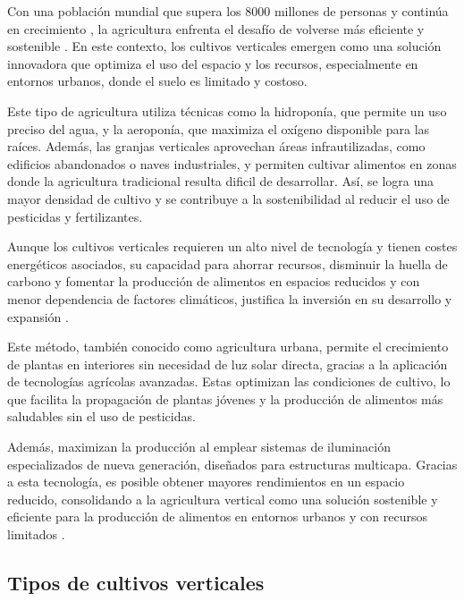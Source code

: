 Con una población mundial que supera los 8000 millones de personas y continúa en crecimiento \cite{PEOPLE}, la agricultura enfrenta el desafío de volverse más eficiente y sostenible \cite{AGUA} \cite{FAO} \cite{SANTANDER}. En este contexto, los cultivos verticales emergen como una solución innovadora que optimiza el uso del espacio y los recursos, especialmente en entornos urbanos, donde el suelo es limitado y costoso.

Este tipo de agricultura utiliza técnicas como la hidroponía, que permite un uso preciso del agua, y la aeroponía, que maximiza el oxígeno disponible para las raíces. Además, las granjas verticales aprovechan áreas infrautilizadas, como edificios abandonados o naves industriales, y permiten cultivar alimentos en zonas donde la agricultura tradicional resulta dificil de desarrollar. Así, se logra una mayor densidad de cultivo y se contribuye a la sostenibilidad al reducir el uso de pesticidas y fertilizantes.

Aunque los cultivos verticales requieren un alto nivel de tecnología y tienen costes energéticos asociados, su capacidad para ahorrar recursos, disminuir la huella de carbono y fomentar la producción de alimentos en espacios reducidos y con menor dependencia de factores climáticos, justifica la inversión en su desarrollo y expansión \cite{alhwarin2020vertical}.

Este método, también conocido como agricultura urbana, permite el crecimiento de plantas en interiores sin necesidad de luz solar directa, gracias a la aplicación de tecnologías agrícolas avanzadas. Estas optimizan las condiciones de cultivo, lo que facilita la propagación de plantas jóvenes y la producción de alimentos más saludables sin el uso de pesticidas.

Además, maximizan la producción al emplear sistemas de iluminación especializados de nueva generación, diseñados para estructuras multicapa. Gracias a esta tecnología, es posible obtener mayores rendimientos en un espacio reducido, consolidando a la agricultura vertical como una solución sostenible y eficiente para la producción de alimentos en entornos urbanos y con recursos limitados \cite{SANTANDER}.

\subsection{Tipos de cultivos verticales}


